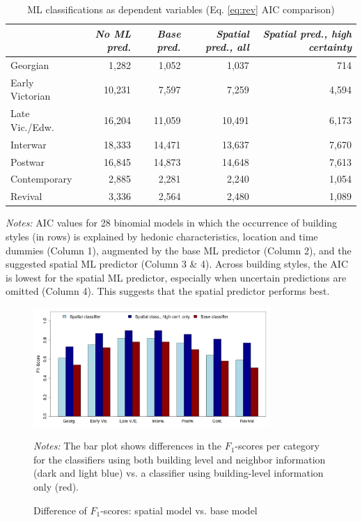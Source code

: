 \documentclass[]{article}
\begin{document}
\clearpage
\begin{table}[htb!]
\caption{ML classifications as dependent variables (Eq. \ref{eq:rev} AIC comparison) }
\label{tab:aic}
\centering
\begin{tabular}{lrrrr}
  \toprule
 & \emph{No ML pred.} & \emph{Base pred.} & \emph{Spatial pred., all} & \emph{Spatial pred., high certainty} \\ 
  \midrule
  Georgian & 1,282 & 1,052 & 1,037 & 714 \\ 
  Early Victorian & 10,231 & 7,597 & 7,259 & 4,594 \\ 
  Late Vic./Edw. & 16,204 & 11,059 & 10,491 & 6,173 \\ 
  Interwar & 18,333 & 14,471 & 13,637 & 7,670 \\ 
  Postwar & 16,845 & 14,873 & 14,648 & 7,613 \\ 
  Contemporary & 2,885 & 2,281 & 2,240 & 1,054 \\ 
  Revival & 3,336 & 2,564 & 2,480 & 1,089 \\ 
   \bottomrule
\end{tabular}
\begin{minipage}{0.7\textwidth}
\vspace{0.25cm}
\footnotesize \emph{Notes:}
AIC values for 28 binomial models in which the occurrence of building styles (in rows) is explained by hedonic characteristics, location and time dummies (Column 1), augmented by the base ML predictor (Column 2), and the suggested spatial ML predictor (Column 3 \& 4). Across building styles, the AIC is lowest for the spatial ML predictor, especially when uncertain predictions are omitted (Column 4). This suggests that the spatial predictor performs best.
\end{minipage}
\end{table}

\begin{figure}[htb!]
  \caption{Difference of $F_1$-scores: spatial model vs. base model }
  \centering
    \includegraphics[width=0.8\textwidth]{figures/barplot_f1scores.jpg}
  \label{fig:boxplot}
\begin{minipage}{0.7\textwidth}
\vspace{0.25cm}
\footnotesize \emph{Notes:} The bar plot shows differences in the $F_1$-scores per category for the classifiers using both building level and neighbor information (dark and light blue) vs. a classifier using building-level information only (red).
\end{minipage}
\end{figure}
\end{document}

